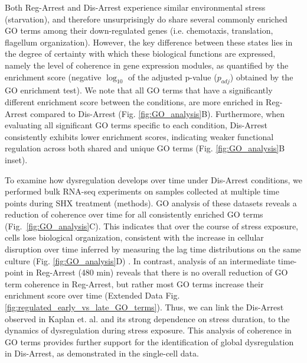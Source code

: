 \documentclass[12pt]{article}
\begin{document}
Both Reg-Arrest and Dis-Arrest experience similar environmental stress (starvation), and therefore unsurprisingly do share several commonly enriched GO terms among their down-regulated genes (i.e. chemotaxis, translation, flagellum organization). However, the key difference between these states lies in the degree of certainty with which these biological functions are expressed, namely the level of coherence in gene expression modules, as quantified by the enrichment score (negative $\log_{10}$ of the adjusted p-value ($p_{adj}$) obtained by the GO enrichment test). We note that all GO terms that have a significantly different enrichment score between the conditions, are more enriched in Reg-Arrest compared to Dis-Arrest (Fig. \ref{fig:GO_analysis}B). Furthermore, when evaluating all significant GO terms specific to each condition, Dis-Arrest consistently exhibits lower enrichment scores, indicating weaker functional regulation across both shared and unique GO terms (Fig. \ref{fig:GO_analysis}B inset).\par

To examine how dysregulation develops over time under Dis-Arrest conditions, we performed bulk RNA-seq experiments on samples collected at multiple time points during SHX treatment (methods). GO analysis of these datasets reveals a reduction of coherence over time for all consistently enriched GO terms (Fig.~\ref{fig:GO_analysis}C). This indicates that over the course of stress exposure, cells lose biological organization, consistent with the increase in cellular disruption over time inferred by measuring the lag time distributions on the same culture (Fig. \ref{fig:GO_analysis}D) \cite{Kaplan2021,Levin-Reisman2010, Levin-Reisman2014}. In contrast, analysis of an intermediate time-point in Reg-Arrest (480 min) reveals that there is no overall reduction of GO term coherence in Reg-Arrest, but rather most GO terms increase their enrichment score over time (Extended Data Fig. \ref{fig:regulated_early_vs_late_GO_terms}). Thus, we can link the Dis-Arrest observed in Kaplan et. al. \cite{Kaplan2021} and its strong dependence on stress duration, to the dynamics of dysregulation during stress exposure. This analysis of coherence in GO terms provides further support for the identification of global dysregulation in Dis-Arrest, as demonstrated in the single-cell data.
\end{document}
